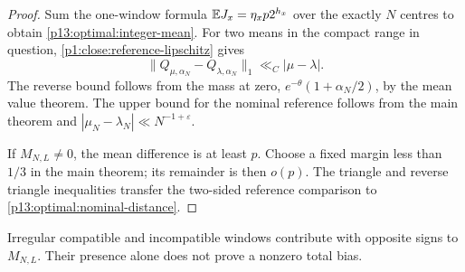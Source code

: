 \begin{proof}
Sum the one-window formula
\(\mathbb E J_x=\eta_xp2^{h_x}\) over the exactly \(N\)
centres to obtain \eqref{p13:optimal:integer-mean}.
For two means in the compact range in question,
\eqref{p1:close:reference-lipschitz} gives
\[
 \|Q_{\mu,\alpha_N}-Q_{\lambda,\alpha_N}\|_1
 \ll_C|\mu-\lambda|.
\]
The reverse bound follows from the mass at zero,
\(e^{-\theta}(1+\alpha_N/2)\), by the mean value theorem.
The upper bound for the nominal reference follows
from the main theorem and
\(|\mu_N-\lambda_N|\ll N^{-1+\varepsilon}\).

If \(M_{N,L}\ne0\), the mean difference is at least \(p\).
Choose a fixed margin less than \(1/3\) in the main
theorem; its remainder is then \(o(p)\).
The triangle and reverse triangle inequalities transfer
the two-sided reference comparison to
\eqref{p13:optimal:nominal-distance}.
\end{proof}

Irregular compatible and incompatible windows contribute
with opposite signs to \(M_{N,L}\). Their presence alone
does not prove a nonzero total bias.
